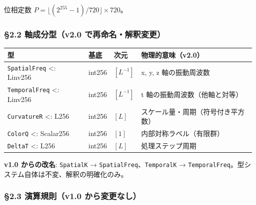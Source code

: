 \documentclass[a4paper,11pt]{ltjsarticle}
\newcounter{none}
\begin{document}
位相定数 \(P = \lfloor (2^{255}-1)/720 \rfloor \times 720\)。

\subsubsection{§2.2 軸成分型（v2.0
で再命名・解釈変更）}\label{ux8ef8ux6210ux5206ux578bv2.0-ux3067ux518dux547dux540dux89e3ux91c8ux5909ux66f4}

{\def\LTcaptype{none} %
\begin{longtable}[]{@{}
  >{\raggedright\arraybackslash}p{}
  >{\raggedright\arraybackslash}p{}
  >{\raggedright\arraybackslash}p{}
  >{\raggedright\arraybackslash}p{}@{}}
\toprule\noalign{}
\begin{minipage}[b]{\linewidth}\raggedright
型
\end{minipage} & \begin{minipage}[b]{\linewidth}\raggedright
基底
\end{minipage} & \begin{minipage}[b]{\linewidth}\raggedright
次元
\end{minipage} & \begin{minipage}[b]{\linewidth}\raggedright
物理的意味（v2.0）
\end{minipage} \\
\midrule\noalign{}
\endhead
\bottomrule\noalign{}
\endlastfoot
\texttt{SpatialFreq} \textless: Linv256 & int256 & \([L^{-1}]\) & x, y,
z 軸の振動周波数 \\
\texttt{TemporalFreq} \textless: Linv256 & int256 & \([L^{-1}]\) & t
軸の振動周波数（他軸と対等） \\
\texttt{CurvatureR} \textless: L256 & int256 & \([L]\) &
スケール量・周期（符号付き平方数） \\
\texttt{ColorQ} \textless: Scalar256 & int256 & \([1]\) &
内部対称ラベル（有限群） \\
\texttt{DeltaT} \textless: L256 & int256 & \([L]\) & 処理ステップ周期 \\
\end{longtable}
}

\textbf{v1.0 からの改名}: \texttt{SpatialK} →
\texttt{SpatialFreq}、\texttt{TemporalK} →
\texttt{TemporalFreq}。型システム自体は不変、解釈の明確化のみ。

\subsubsection{§2.3 演算規則（v1.0
から変更なし）}\label{ux6f14ux7b97ux898fux5247v1.0-ux304bux3089ux5909ux66f4ux306aux3057}
\end{document}
